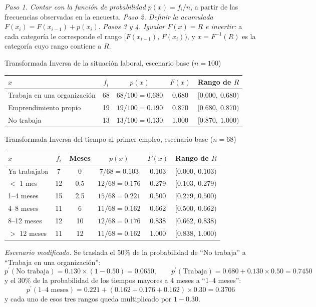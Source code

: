 \textit{Paso 1. Contar con la función de probabilidad} $p(x) = f_i/n$, a partir de las frecuencias observadas en la encuesta. \textit{Paso 2. Definir la acumulada} $F(x_i) = F(x_{i-1}) + p(x_i)$. \textit{Pasos 3 y 4. Igualar $F(x) = R$ e invertir:} a cada categoría le corresponde el rango $[F(x_{i-1}),\,F(x_i))$, y $x = F^{-1}(R)$ es la categoría cuyo rango contiene a $R$.

\begin{mitabla}{Transformada Inversa de la situación laboral, escenario base ($n=100$) \datosprueba}
\begin{tabular}{lcccc}
\toprule
$x$ & $f_i$ & $p(x)$ & $F(x)$ & Rango de $R$ \\
\midrule
Trabaja en una organización & 68 & $68/100 = 0.680$ & 0.680 & $[0.000,\ 0.680)$ \\
Emprendimiento propio & 19 & $19/100 = 0.190$ & 0.870 & $[0.680,\ 0.870)$ \\
No trabaja & 13 & $13/100 = 0.130$ & 1.000 & $[0.870,\ 1.000)$ \\
\bottomrule
\end{tabular}
\end{mitabla}

\begin{mitabla}{Transformada Inversa del tiempo al primer empleo, escenario base ($n=68$) \datosprueba}
\begin{tabular}{lccccc}
\toprule
$x$ & $f_i$ & Meses & $p(x)$ & $F(x)$ & Rango de $R$ \\
\midrule
Ya trabajaba & 7 & 0 & $7/68 = 0.103$ & 0.103 & $[0.000,\ 0.103)$ \\
$<$ 1 mes & 12 & 0.5 & $12/68 = 0.176$ & 0.279 & $[0.103,\ 0.279)$ \\
1–4 meses & 15 & 2.5 & $15/68 = 0.221$ & 0.500 & $[0.279,\ 0.500)$ \\
4–8 meses & 11 & 6 & $11/68 = 0.162$ & 0.662 & $[0.500,\ 0.662)$ \\
8–12 meses & 12 & 10 & $12/68 = 0.176$ & 0.838 & $[0.662,\ 0.838)$ \\
$>$ 12 meses & 11 & 12 & $11/68 = 0.162$ & 1.000 & $[0.838,\ 1.000)$ \\
\bottomrule
\end{tabular}
\end{mitabla}

\textit{Escenario modificado.} Se traslada el 50\% de la probabilidad de ``No trabaja'' a ``Trabaja en una organización'':
\[
p^{\prime}(\text{No trabaja}) = 0.130 \times (1 - 0.50) = 0.0650, \qquad p^{\prime}(\text{Trabaja}) = 0.680 + 0.130 \times 0.50 = 0.7450
\]
y el 30\% de la probabilidad de los tiempos mayores a 4 meses a ``1--4 meses'':
\[
p^{\prime}(\text{1--4 meses}) = 0.221 + (0.162 + 0.176 + 0.162) \times 0.30 = 0.3706
\]
y cada uno de esos tres rangos queda multiplicado por $1 - 0.30$.

